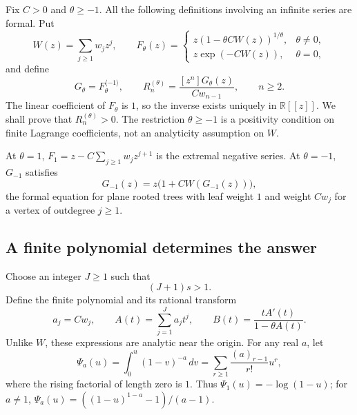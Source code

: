 \documentclass[11pt,a4paper]{article}
\theoremstyle{definition}
\theoremstyle{remark}
\newcommand{\R}{\mathbb R}
\newcommand{\inv}{^{\langle-1\rangle}}
\newcommand{\rise}[2]{(#1)_{#2}}
\numberwithin{equation}{section}
\begin{document}
Fix $C>0$ and $\theta\ge-1$. All the following definitions involving
an infinite series are formal. Put
\begin{equation}
 W(z)=\sum_{j\ge1}w_jz^j,
 \qquad
 F_\theta(z)=
 \begin{cases}
 z(1-\theta CW(z))^{1/\theta},&\theta\ne0,\\
 z\exp(-CW(z)),&\theta=0,
 \end{cases}
 \label{eq:Ftheta}
\end{equation}
and define
\begin{equation}
 G_\theta=F_\theta\inv,
 \qquad R_n^{(\theta)}=
 \frac{[z^n]G_\theta(z)}{Cw_{n-1}},\qquad n\ge2.
 \label{eq:Rtheta}
\end{equation}
The linear coefficient of $F_\theta$ is $1$, so the inverse exists
uniquely in $\R[[z]]$. We shall prove that $R_n^{(\theta)}>0$.
The restriction $\theta\ge-1$ is a positivity condition on finite
Lagrange coefficients, not an analyticity assumption on $W$.

At $\theta=1$, $F_1=z-C\sum_{j\ge1}w_jz^{j+1}$ is the extremal
negative series. At $\theta=-1$, $G_{-1}$ satisfies
\begin{equation}
 G_{-1}(z)=z\bigl(1+CW(G_{-1}(z))\bigr),
 \label{eq:treeeq}
\end{equation}
the formal equation for plane rooted trees with leaf weight $1$ and
weight $Cw_j$ for a vertex of outdegree $j\ge1$.

\subsection{A finite polynomial determines the answer}
Choose an integer $J\ge1$ such that
\begin{equation}
 (J+1)s>1.
 \label{eq:J}
\end{equation}
Define the finite polynomial and its rational transform
\begin{equation}
 a_j=Cw_j,\qquad
 A(t)=\sum_{j=1}^J a_jt^j,
 \qquad B(t)=\frac{tA'(t)}{1-\theta A(t)}.
 \label{eq:AB}
\end{equation}
Unlike $W$, these expressions are analytic near the origin.
For any real $a$, let
\begin{equation}
 \Psi_a(u)=\int_0^u(1-v)^{-a}\,dv
 =\sum_{r\ge1}\frac{\rise{a}{r-1}}{r!}u^r,
 \label{eq:Psi}
\end{equation}
where the rising factorial of length zero is $1$. Thus
$\Psi_1(u)=-\log(1-u)$; for $a\ne1$,
$\Psi_a(u)=((1-u)^{1-a}-1)/(a-1)$.
\end{document}
